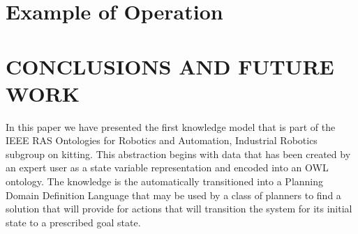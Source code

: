 \documentclass[a4paper, 10pt, conference]{ieeeconf}      %
\begin{document}

\section{Example of Operation}
\label{sect:Example}




\section{CONCLUSIONS AND FUTURE WORK}
\label{sect:Conclusions}
In this paper we have presented the first knowledge model that is part of the IEEE RAS Ontologies for Robotics and Automation, Industrial Robotics subgroup on kitting.
This abstraction begins with data that has been created by an expert user as a state variable representation and encoded into an OWL ontology. The knowledge
is the automatically transitioned into a Planning Domain Definition Language that may be used by a class of planners to find a solution that will provide for actions that will
transition the system for its initial state to a prescribed goal state.
\end{document}
